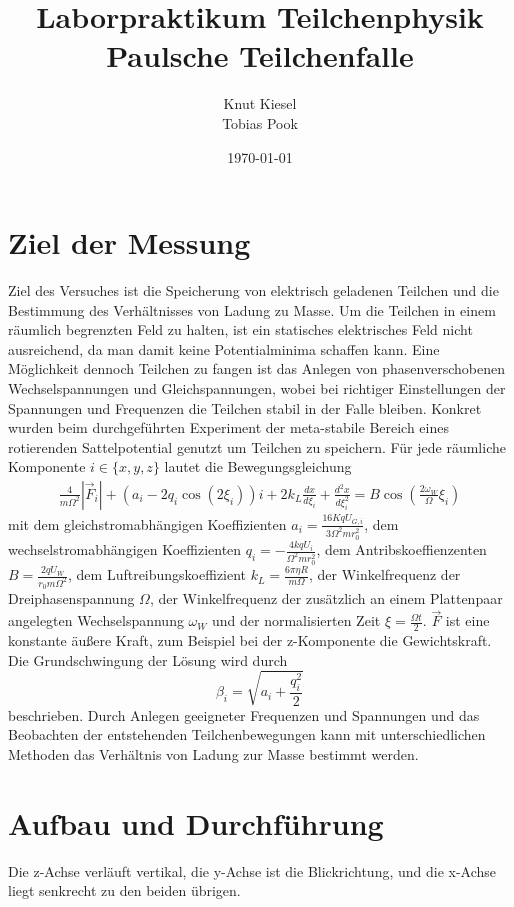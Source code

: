 \documentclass[a4paper,12pt]{article}
\title{Laborpraktikum Teilchenphysik\\ Paulsche Teilchenfalle}
\author{Knut Kiesel\\Tobias Pook}
\date{\today}
\begin{document}
\maketitle
\vspace{5cm}
\tableofcontents
\thispagestyle{empty}
\newpage
\setcounter{page}{1}

\section{Ziel der Messung} %
Ziel des Versuches ist die Speicherung von elektrisch geladenen Teilchen und die Bestimmung des Verhältnisses von Ladung zu Masse.
Um die Teilchen in einem räumlich begrenzten Feld zu halten, ist ein statisches elektrisches Feld nicht ausreichend, da man damit keine Potentialminima schaffen kann.
Eine Möglichkeit dennoch Teilchen zu fangen ist das Anlegen von phasenverschobenen Wechselspannungen und Gleichspannungen, wobei bei richtiger Einstellungen der Spannungen und Frequenzen die Teilchen stabil in der Falle bleiben.
Konkret wurden beim durchgeführten Experiment der meta-stabile Bereich eines rotierenden Sattelpotential genutzt um Teilchen zu speichern.
Für jede räumliche Komponente $i\in\{x,y,z\}$ lautet die Bewegungsgleichung
\begin{align}\label{mastergleichung}
	\frac{4}{mΩ^2} |\vec{F}_i| + \left( a_i -2q_i \cos\left( 2\xi_i \right) \right) i  + 2k_L \frac{dx}{d\xi_i} + \frac{d^2x}{d\xi_i^2} = B\cos\left( \frac{2ω_W}{Ω}ξ_i \right)
\end{align}
mit dem gleichstromabhängigen Koeffizienten $a_i = \frac{16KqU_{G,i}}{3Ω^2mr_0^2}$,
dem wechselstromabhängigen Koeffizienten  $q_i = -\frac{4kqU_i}{Ω^2mr_0^2}$,
dem Antribskoeffienzenten $B = \frac{2qU_W}{r_0mΩ^2}$,
dem Luftreibungskoeffizient $k_L = \frac{6πηR}{mΩ}$, der Winkelfrequenz der Dreiphasenspannung $Ω$,
der Winkelfrequenz der zusätzlich an einem Plattenpaar angelegten Wechselspannung $ω_W$
und der normalisierten Zeit $ξ = \frac{Ωt}{2}$.
$\vec{F}$ ist eine konstante äußere Kraft, zum Beispiel bei der z-Komponente die Gewichtskraft.
Die Grundschwingung der Lösung wird durch
$$β_i = \sqrt{a_i + \frac{q_i^2}{2}}$$
beschrieben.
Durch Anlegen geeigneter Frequenzen und Spannungen und das Beobachten der entstehenden Teilchenbewegungen kann mit unterschiedlichen Methoden das Verhältnis von Ladung zur Masse bestimmt werden.


\section{Aufbau und Durchführung}
Die z-Achse verläuft vertikal, die y-Achse ist die Blickrichtung, und die x-Achse liegt senkrecht zu den beiden übrigen.
\end{document}

